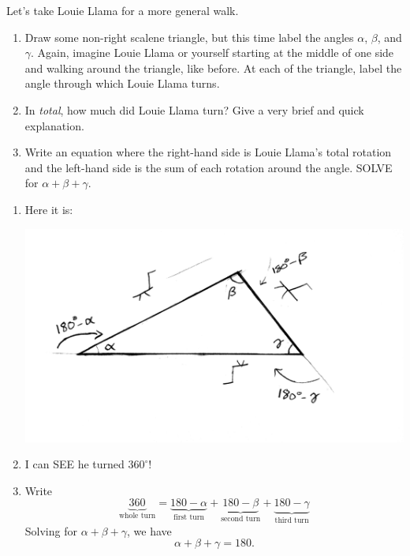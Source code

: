 \documentclass[nooutcomes,noauthor,handout]{../ximera}
\begin{document}
\mynewpage


\begin{question}
  Let's take Louie Llama for a more general walk.
  \begin{enumerate}
  \item Draw some non-right scalene triangle, but this time label the
    angles $\alpha$, $\beta$, and $\gamma$. Again, imagine Louie Llama or yourself 
    starting at the middle of one side and walking around the
    triangle, like before. At each
    of the triangle, label the angle through which Louie Llama turns.
  \item In \emph{total}, how much did Louie Llama turn? Give a very brief and quick explanation.
  \item Write an equation where the right-hand side is Louie Llama's
    total rotation and the left-hand side is the sum of each rotation
    around the angle. SOLVE for $\alpha+\beta+\gamma$.
  \end{enumerate}
  \begin{freeResponse}
    \begin{enumerate}
    \item Here it is:
      \begin{center}
        \includegraphics[width=.4\textwidth]{generalTriAndLlama.jpg}
      \end{center}
    \item I can SEE he turned $360^\circ$!
    \item Write
      \[
      \underbrace{360}_{\text{whole turn}} = \underbrace{180-\alpha}_{\text{first turn}} + \underbrace{180-\beta}_{\text{second turn}} + \underbrace{180-\gamma}_{\text{third turn}}
      \]
      Solving for $\alpha + \beta + \gamma$, we have
      \[
      \alpha + \beta + \gamma = 180.
      \]
    \end{enumerate}
  \end{freeResponse}
\end{question}

\mynewpage
\end{document}
